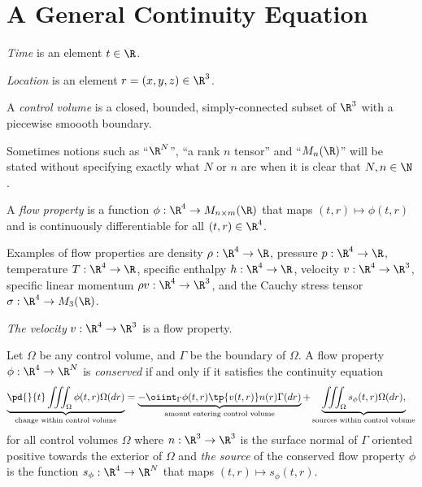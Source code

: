 \section{A General Continuity Equation}

\begin{df}[Time]
    \emph{Time} is an element $t\in \R$.
\end{df}

\begin{df}[Location]
    \emph{Location} is an element $r=(x,y,z)\in \R^3$.
\end{df}

\begin{df}
    A \emph{control volume} is a closed, bounded,
    simply-connected subset of $\R^3$ with a piecewise smoooth boundary.
\end{df}

\begin{rk}
Sometimes notions such as ``$\R^N$'', ``a rank $n$ tensor'' and ``$M_n(\R)$''
will be stated without specifying exactly what $N$ or $n$ are when it
is clear that $N,n\in\N$.
\end{rk}

\begin{df}
A \emph{flow property} is a function
$\phi:\R^4 \to M_{n\times m}(\R)$ that maps $(t,r)\mapsto \phi(t,r)$
and is continuously differentiable for all $(t,r)\in \R^4$.
\end{df}

\begin{rk}
Examples of flow properties are density $\rho:\R^4\to \R$, 
pressure $p:\R^4\to \R$, temperature $T:\R^4\to \R$, specific enthalpy $h:\R^4\to \R$,
velocity $v:\R^4\to \R^3$, specific linear momentum $\rho v:\R^4\to \R^3$, and the Cauchy stress
tensor $\sigma:\R^4\to M_3(\R)$.
\end{rk}

\begin{df}[Velocity]
\emph{The velocity} $v:\R^4\to \R^3$ is a flow property.
\end{df}

\begin{df}
Let $\Omega$ be any control volume, and $\Gamma$ be the boundary of $\Omega$.
A flow property $\phi:\R^4\to \R^N$ is \emph{conserved} if and only if it satisfies the
continuity equation
    \begin{equation}
        \underbrace{\pd{}{t} \iiint_\Omega \phi(t,r) \Omega(dr)}_{\text{change within control volume}}
        =
        \underbrace{-\oiint_\Gamma \phi(t,r) \tp{v(t,r)} n(r) \Gamma(dr)}_{\text{amount entering control volume}}
        + \underbrace{\iiint_\Omega s_\phi(t,r) \Omega(dr),}_{\text{sources within control volume}}
    \end{equation}
for all control volumes $\Omega$
where $n:\R^3\to \R^3$ is the surface normal of $\Gamma$ oriented positive towards
the exterior of $\Omega$ and
\emph{the source} of the conserved flow property $\phi$ is the function
$s_\phi:\R^4 \to \R^N$ that maps $(t,r)\mapsto s_\phi(t,r)$.
\end{df}

